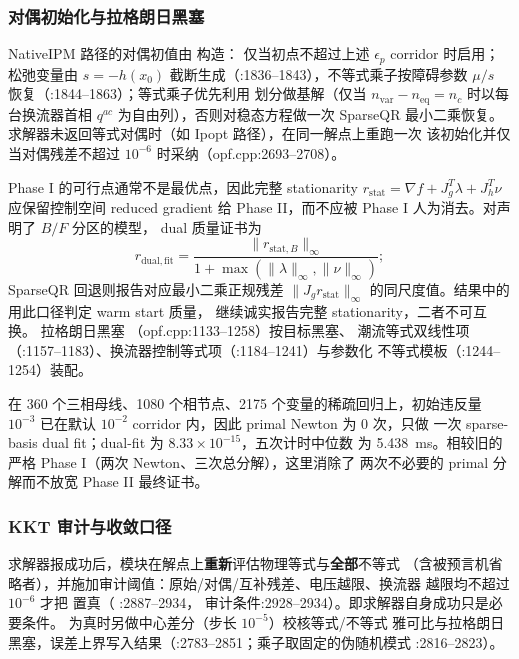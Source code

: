 \subsubsection*{对偶初始化与拉格朗日黑塞}
NativeIPM 路径的对偶初值由  构造：
仅当初点不超过上述 $\epsilon_p$ corridor 时启用；
松弛变量由 $s=-h(x_0)$ 截断生成（:1836--1843），不等式乘子按障碍参数
$\mu/s$ 恢复（:1844--1863）；等式乘子优先利用
 划分做基解（仅当 $n_{\mathrm{var}}-n_{\mathrm{eq}}=n_c$
时以每台换流器首相 $q^{ac}$ 为自由列），否则对稳态方程做一次 SparseQR
最小二乘恢复。求解器未返回等式对偶时（如 Ipopt 路径），在同一解点上重跑一次
该初始化并仅当对偶残差不超过 $10^{-6}$ 时采纳（opf.cpp:2693--2708）。

Phase I 的可行点通常不是最优点，因此完整 stationarity
$r_{\mathrm{stat}}=\nabla f+J_g^T\lambda+J_h^T\nu$ 应保留控制空间 reduced
gradient 给 Phase II，而不应被 Phase I 人为消去。对声明了 $B/F$ 分区的模型，
dual 质量证书为
\begin{equation}
 r_{\mathrm{dual,fit}}=
 \frac{\|r_{\mathrm{stat},B}\|_\infty}
 {1+\max(\|\lambda\|_\infty,\|\nu\|_\infty)};
 \label{eq:phase-one-dual-fit}
\end{equation}
SparseQR 回退则报告对应最小二乘正规残差
$\|J_g r_{\mathrm{stat}}\|_\infty$ 的同尺度值。结果中的
 用此口径判定 warm start 质量，
 继续诚实报告完整 stationarity，二者不可互换。
拉格朗日黑塞 （opf.cpp:1133--1258）按目标黑塞、
潮流等式双线性项（:1157--1183）、换流器控制等式项（:1184--1241）与参数化
不等式模板（:1244--1254）装配。

在 360 个三相母线、1080 个相节点、2175 个变量的稀疏回归上，初始违反量
$10^{-3}$ 已在默认 $10^{-2}$ corridor 内，因此 primal Newton 为 0 次，只做
一次 sparse-basis dual fit；dual-fit 为 $8.33\times10^{-15}$，五次计时中位数
为 5.438~ms。相较旧的严格 Phase I（两次 Newton、三次总分解），这里消除了
两次不必要的 primal 分解而不放宽 Phase II 最终证书。

\subsubsection*{KKT 审计与收敛口径}
求解器报成功后，模块在解点上\textbf{重新}评估物理等式与\textbf{全部}不等式
（含被预言机省略者），并施加审计阈值：原始/对偶/互补残差、电压越限、换流器
越限均不超过 $10^{-6}$ 才把  置真（
:2887--2934，
审计条件:2928--2934）。即求解器自身成功只是必要条件。
 为真时另做中心差分（步长 $10^{-5}$）校核等式/不等式
雅可比与拉格朗日黑塞，误差上界写入结果（:2783--2851；乘子取固定的伪随机模式
:2816--2823）。

